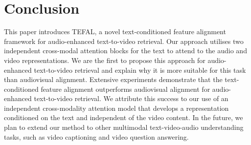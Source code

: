 \documentclass[10pt,twocolumn,letterpaper]{article}
\begin{document}
\begin{table}[h]
\centering
{}
\caption{Results on all datasets showing the effect of a reduced search (by 90\%) space during inference.}
  \label{tab:scale}
\end{table}

\section{Conclusion}
This paper introduces TEFAL, a novel text-conditioned feature alignment framework for audio-enhanced text-to-video retrieval. Our approach utilises two independent cross-modal attention blocks for the text to attend to the audio and video representations. We are the first to propose this approach for audio-enhanced text-to-video retrieval and explain why it is more suitable for this task than audiovisual alignment.  Extensive experiments demonstrate that the text-conditioned feature alignment outperforms audiovisual alignment for audio-enhanced text-to-video retrieval. We attribute this success to our use of an independent cross-modality attention model that develops a representation conditioned on the text and independent of the video content. In the future, we plan to extend our method to other multimodal text-video-audio understanding tasks, such as video captioning and video question answering.


{\small



}
\end{document}
